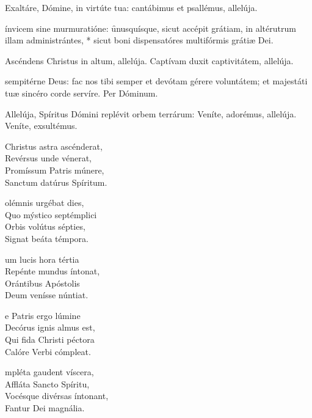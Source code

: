\documentclass[fontsize=9pt,paper=A6,twoside,BCOR=1mm,DIV=22,headinclude]{scrarticle}
\begin{document}
\begin{multicols}{2}






\A Exaltáre, Dómine, in virtúte tua: cantábimus et psallémus, allelúja.

 ínvicem sine murmuratióne: \f unusquísque, sicut accépit grátiam, in altérutrum illam administrántes, * sicut boni dispensatóres multifórmis grátiæ Dei.

\V Ascéndens Christus in altum, allelúja.
\R Captívam duxit captivitátem, allelúja.

 sempitérne Deus: fac nos tibi semper et devótam gérere voluntátem; et majestáti tuæ sincéro corde servíre. Per Dóminum.




{

\I Allelúja, Spíritus Dómini replévit orbem terrárum: \red{*} Veníte, adorémus, allelúja.
 Veníte, exsultémus.

\begin{hymnus}
 Christus astra ascénderat,\\
\hspace{1.1em} Revérsus unde vénerat,\\
Promíssum Patris múnere,\\
Sanctum datúrus Spíritum.

olémnis urgébat dies,\\
Quo mýstico septémplici\\
Orbis volútus sépties,\\
Signat beáta témpora.

um lucis hora tértia\\
Repénte mundus íntonat,\\
Orántibus Apóstolis\\
Deum venísse núntiat.

e Patris ergo lúmine\\
Decórus ignis almus est,\\
Qui fida Christi péctora\\
Calóre Verbi cómpleat.

mpléta gaudent víscera,\\
Affláta Sancto Spíritu,\\
Vocésque divérsas íntonant,\\
Fantur Dei magnália.


\end{hymnus}}
\end{multicols}
\end{document}

